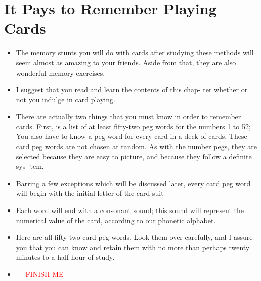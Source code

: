     \section*{It Pays to Remember Playing Cards}
        \begin{itemize}
            \item The memory stunts you will do with cards after studying
            these methods will seem almost as amazing to your friends.
            Aside from that, they are also wonderful memory exercises.
            \item I suggest that you read and learn the contents of this chap-
            ter whether or not you indulge in card playing.
            \item There are actually two things that you must know in
            order to remember cards.
                \subitem First, is a list of at least fifty-two
            peg words for the numbers 1 to 52;
                \subitem You also have to know a peg word for every card in a deck
            of cards.
                \subitem These card peg words are not chosen at random.
                \subitem As with the number pegs, they are selected because they are easy to picture, and because they follow a definite sys-
            tem.
            \item Barring a few exceptions which will be discussed later,
            every card peg word will begin with the initial letter of the
            card suit
            \item Each word will end with a consonant sound; this sound will represent the numerical value
            of the card, according to our phonetic alphabet.
            \item Here are all fifty-two card peg words. Look them over
            carefully, and I assure you that you can know and retain
            them with no more than perhaps twenty minutes to a half
            hour of study.
            \item \textcolor{red}{--- FINISH ME -----}
        \end{itemize}

